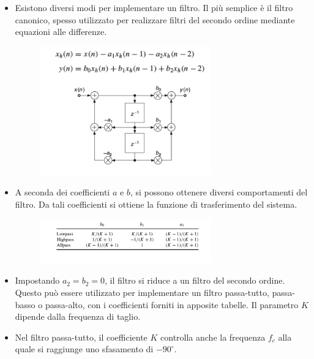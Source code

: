 \begin{itemize}
    \item Esistono diversi modi per implementare un filtro. Il più semplice è il filtro canonico, spesso utilizzato per realizzare filtri del secondo ordine mediante equazioni alle differenze.
    
    \begin{figure}[H]
        \centering
        \includegraphics[width=0.7\textwidth]{capitoli/capitolo15/immagini/image1.png}
    \end{figure}
    

    \item A seconda dei coefficienti $a$ e $b$, si possono ottenere diversi comportamenti del filtro. Da tali coefficienti si ottiene la funzione di trasferimento del sistema.
    
    \begin{figure}[H]
        \centering
        \includegraphics[width=0.7\textwidth]{capitoli/capitolo15/immagini/image2.png}
    \end{figure}

    \item Impostando $a_2 = b_2 = 0$, il filtro si riduce a un filtro del secondo ordine. Questo può essere utilizzato per implementare un filtro passa-tutto, passa-basso o passa-alto, con i coefficienti forniti in apposite tabelle. Il parametro $K$ dipende dalla frequenza di taglio.
    
    \item Nel filtro passa-tutto, il coefficiente $K$ controlla anche la frequenza $f_c$ alla quale si raggiunge uno sfasamento di $-90^\circ$.
\end{itemize}


